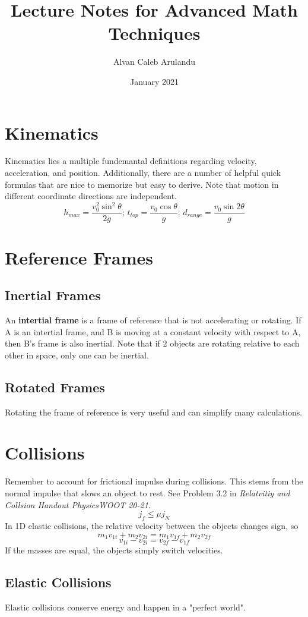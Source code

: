 \documentclass{article}
\title{Lecture Notes for Advanced Math Techniques}
\author{Alvan Caleb Arulandu}
\date{January 2021}
\begin{document}
\maketitle

\section{Kinematics}
    Kinematics lies a multiple fundemantal definitions regarding velocity, acceleration, and position. 
    Additionally, there are a number of helpful quick formulas that are nice to memorize but easy to derive. Note
    that motion in different coordinate directions are independent.
    $$h_{max}=\frac{v_{0}^{2}\sin^{2}\theta}{2g};\, t_{top}=\frac{v_{0}\cos\theta}{g};\, d_{range}=\frac{v_{0}\sin 2\theta}{g}$$
\section{Reference Frames}
    \subsection{Inertial Frames}
        An \textbf{intertial frame} is a frame of reference that is not accelerating or rotating.
        If A is an intertial frame, and B is moving at a constant velocity with respect to A, then B's frame is also inertial.
        Note that if 2 objects are rotating relative to each other in space, only one can be inertial.

    \subsection{Rotated Frames}
        Rotating the frame of reference is very useful and can simplify many calculations.

\section{Collisions}
    Remember to account for frictional impulse during collisions. This stems from the normal impulse that slows an object to rest. See Problem 3.2 in {\it Relatvitiy and Collsion Handout PhysicsWOOT 20-21}.
    $$j_{f}\leq \mu j_{N}$$
    In 1D elastic collisions, the relative velocity between the objects changes sign, so
    $$m_{1}v_{1i}+m_{2}v_{2i}=m_{1}v_{1f}+m_{2}v_{2f}$$
    $$v_{1i}-v_{2i}=v_{2f}-v_{1f}$$
    If the masses are equal, the objects simply switch velocities.

    \subsection{Elastic Collisions}
        Elastic collisions conserve energy and happen in a "perfect world".
\end{document}
